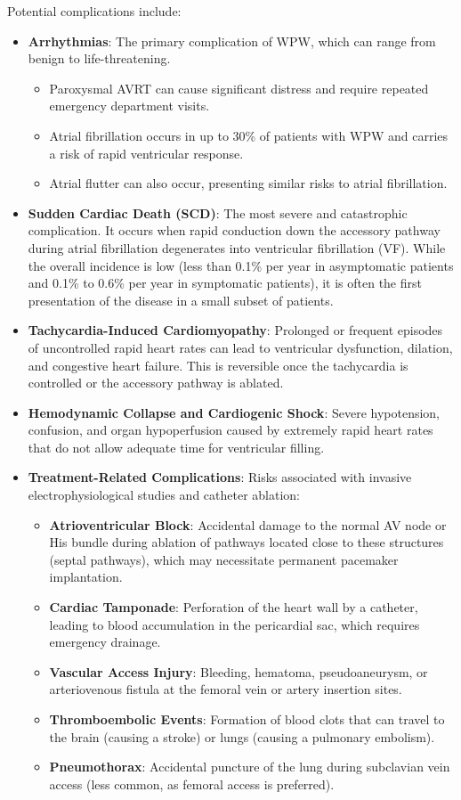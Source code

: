 Potential complications include:
\begin{itemize}
  \item \textbf{Arrhythmias}: The primary complication of WPW, which can range from benign to life-threatening.
    \begin{itemize}
      \item Paroxysmal AVRT can cause significant distress and require repeated emergency department visits.
      \item Atrial fibrillation occurs in up to 30\% of patients with WPW and carries a risk of rapid ventricular response.
      \item Atrial flutter can also occur, presenting similar risks to atrial fibrillation.
    \end{itemize}
  \item \textbf{Sudden Cardiac Death (SCD)}: The most severe and catastrophic complication. It occurs when rapid conduction down the accessory pathway during atrial fibrillation degenerates into ventricular fibrillation (VF). While the overall incidence is low (less than 0.1\% per year in asymptomatic patients and 0.1\% to 0.6\% per year in symptomatic patients), it is often the first presentation of the disease in a small subset of patients.
  \item \textbf{Tachycardia-Induced Cardiomyopathy}: Prolonged or frequent episodes of uncontrolled rapid heart rates can lead to ventricular dysfunction, dilation, and congestive heart failure. This is reversible once the tachycardia is controlled or the accessory pathway is ablated.
  \item \textbf{Hemodynamic Collapse and Cardiogenic Shock}: Severe hypotension, confusion, and organ hypoperfusion caused by extremely rapid heart rates that do not allow adequate time for ventricular filling.
  \item \textbf{Treatment-Related Complications}: Risks associated with invasive electrophysiological studies and catheter ablation:
    \begin{itemize}
      \item \textbf{Atrioventricular Block}: Accidental damage to the normal AV node or His bundle during ablation of pathways located close to these structures (septal pathways), which may necessitate permanent pacemaker implantation.
      \item \textbf{Cardiac Tamponade}: Perforation of the heart wall by a catheter, leading to blood accumulation in the pericardial sac, which requires emergency drainage.
      \item \textbf{Vascular Access Injury}: Bleeding, hematoma, pseudoaneurysm, or arteriovenous fistula at the femoral vein or artery insertion sites.
      \item \textbf{Thromboembolic Events}: Formation of blood clots that can travel to the brain (causing a stroke) or lungs (causing a pulmonary embolism).
      \item \textbf{Pneumothorax}: Accidental puncture of the lung during subclavian vein access (less common, as femoral access is preferred).
    \end{itemize}
\end{itemize}


